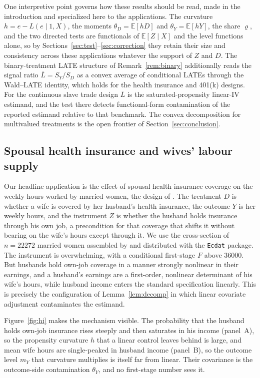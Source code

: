\documentclass[preprint,11pt,authoryear]{elsarticle}
\theoremstyle{definition}
\newcommand{\E}{\mathbb{E}}
\begin{document}
One interpretive point governs how these results should be read, made in the
introduction and specialized here to the applications. The curvature $h=e-L(e\mid1,X)$, the
moments $\theta_D=\E[hD]$ and $\theta_Y=\E[hY]$, the share $\varrho$, and the two
directed tests are functionals of $\E[Z\mid X]$ and the level functions alone, so by
Sections~\ref{sec:test}--\ref{sec:correction} they retain their size and consistency
across these applications whatever the support of $Z$ and $D$. The binary-treatment LATE structure
of Remark~\ref{rem:binary} additionally reads the signal ratio $\bar L=S_Y/S_D$ as a
convex average of conditional LATEs through the Wald--LATE identity, which holds for the
health insurance and 401(k) designs. For the continuous slave trade design $\bar L$
is the saturated-propensity linear-IV estimand, and the test there detects
functional-form contamination of the reported estimand relative to that benchmark. The
convex decomposition for multivalued treatments is the open frontier of
Section~\ref{sec:conclusion}.

\subsection{Spousal health insurance and wives' labour supply}\label{sec:hi}

Our headline application is the effect of spousal health insurance coverage on the
weekly hours worked by married women, the design of \citet{olson1998}. The treatment
$D$ is whether a wife is covered by her husband's health insurance, the outcome $Y$ is
her weekly hours, and the instrument $Z$ is whether the husband holds insurance through
his own job, a precondition for that coverage that shifts it without bearing on the
wife's hours except through it. We use the cross-section of $n=\num{22272}$ married
women assembled by \citet{olson1998} and distributed with the \texttt{Ecdat} package.
The instrument is overwhelming, with a conditional first-stage $F$ above \num{36000}.
But husbands hold own-job coverage in a manner strongly nonlinear in their earnings,
and a husband's earnings are a first-order, nonlinear determinant of his wife's hours,
while husband income enters the standard specification linearly. This is precisely the
configuration of Lemma~\ref{lem:decomp} in which linear covariate adjustment
contaminates the estimand.

Figure~\ref{fig:hi} makes the mechanism visible. The probability that the husband
holds own-job insurance rises steeply and then saturates in his income (panel~A), so
the propensity curvature $h$ that a linear control leaves behind is large, and mean
wife hours are single-peaked in husband income (panel~B), so the outcome level $m_Y$
that curvature multiplies is itself far from linear. Their covariance is the
outcome-side contamination $\theta_Y$, and no first-stage number sees it.
\end{document}

